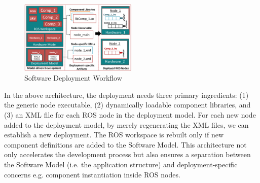\begin{figure}[h]
	\centering
	\includegraphics[width=0.50\textwidth]{figs/workflow.png}
	\caption{Software Deployment Workflow}
	\label{fig:workflow}
\end{figure}

In the above architecture, the deployment needs three primary ingredients: (1) the generic node executable, (2) dynamically loadable component libraries, and (3) an XML file for each ROS node in the deployment model. For each new node added to the deployment model, by merely regenerating the XML files, we can establish a new deployment. The ROS workspace is rebuilt only if new component definitions are added to the Software Model. This architecture not only accelerates the development process but also ensures a separation between the Software Model (i.e. the application structure) and deployment-specific concerns e.g. component instantiation inside ROS nodes.




